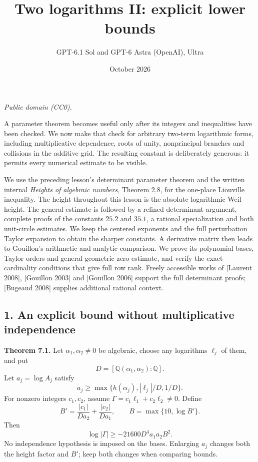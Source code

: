 \documentclass[
  11pt,
  a4paper,
]{article}
\title{Two logarithms II: explicit lower bounds}
\author{GPT-6.1 Sol and GPT-6 Astra (OpenAI), Ultra}
\date{October 2026}
\begin{document}
\maketitle

\emph{Public domain (CC0).}

A parameter theorem becomes useful only after its integers and
inequalities have been checked. We now make that check for arbitrary
two-term logarithmic forms, including multiplicative dependence, roots
of unity, nonprincipal branches and collisions in the additive grid. The
resulting constant is deliberately generous: it permits every numerical
estimate to be visible.

We use the preceding lesson's determinant parameter theorem and the
written internal \emph{Heights of algebraic numbers}, Theorem 2.8, for
the one-place Liouville inequality. The height throughout this lesson is
the absolute logarithmic Weil height. The general estimate is followed
by a refined determinant argument, complete proofs of the constants
\(25.2\) and \(35.1\), a rational specialization and both unit-circle
estimates. We keep the centered exponents and the full perturbation
Taylor expansion to obtain the sharper constants. A derivative matrix
then leads to Gouillon's arithmetic and analytic comparison. We prove
its polynomial bases, Taylor orders and general geometric zero estimate,
and verify the exact cardinality conditions that give full row rank.
Freely accessible works of {[}Laurent 2008{]}, {[}Gouillon 2003{]} and
{[}Gouillon 2006{]} support the full determinant proofs; {[}Bugeaud
2008{]} supplies additional rational context.

\subsection{1. An explicit bound without multiplicative
independence}\label{an-explicit-bound-without-multiplicative-independence}

\textbf{Theorem 7.1.} Let \(\alpha_1,\alpha_2\ne0\) be algebraic, choose
any logarithms \(\ell_j\) of them, and put \[
D=[\mathbb Q(\alpha_1,\alpha_2):\mathbb Q].
\] Let \(a_j=\log A_j\) satisfy \[
a_j\ge\max\{h(\alpha_j),|\ell_j|/D,1/D\}.
\] For nonzero integers \(c_1,c_2\), assume
\(\Gamma=c_1\ell_1+c_2\ell_2\ne0\). Define \[
B'=\frac{|c_1|}{Da_2}+\frac{|c_2|}{Da_1},
\qquad B=\max\{10,\log B'\}.
\] Then \[
\log|\Gamma|\ge-21600D^4a_1a_2B^2. \tag{7.1}
\] No independence hypothesis is imposed on the bases. Enlarging \(a_j\)
changes both the height factor and \(B'\); keep both changes when
comparing bounds.
\end{document}

